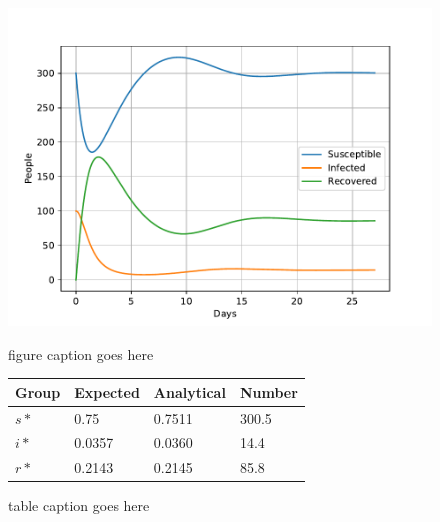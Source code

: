 \documentclass[a4paper]{article}
\begin{document}
\begin{figure}
	\centering
	\begin{minipage}{0.49\textwidth}
		\centering
		\includegraphics[scale=0.6]{../plots/opp_a_C.pdf}
		\caption{figure caption goes here}\label{fig:opp_a_C}
	\end{minipage}
	\begin{minipage}{0.49\textwidth}
		\centering
		\captionsetup{type=table} %
		\begin{tabular}{|l|l|l|l|}
			\hline
			Group & Expected & Analytical   & Number  \\ \hline
			$s*$ & 0.75 & 0.7511 & 300.5 \\ \hline
			$i*$ & 0.0357 & 0.0360 & 14.4 \\ \hline
			$r*$ & 0.2143 & 0.2145 & 85.8 \\ \hline
		\end{tabular}
		\caption{table caption goes  here}\label{tab:opp_a_C}
	\end{minipage}
\end{figure}
\end{document}

